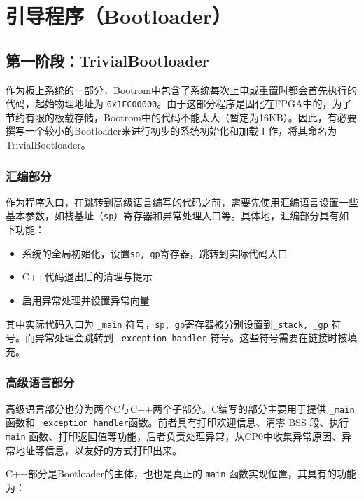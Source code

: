 \chapter{引导程序（Bootloader）}

\section{第一阶段：TrivialBootloader}

作为板上系统的一部分，Bootrom中包含了系统每次上电或重置时都会首先执行的代码，起始物理地址为 \texttt{0x1FC00000}。由于这部分程序是固化在FPGA中的，为了节约有限的板载存储，Bootrom中的代码不能太大（暂定为16KB）。因此，有必要撰写一个较小的Bootloader来进行初步的系统初始化和加载工作，将其命名为TrivialBootloader。

\subsection{汇编部分}

作为程序入口，在跳转到高级语言编写的代码之前，需要先使用汇编语言设置一些基本参数，如栈基址（\texttt{sp}）寄存器和异常处理入口等。具体地，汇编部分具有如下功能：

\begin{itemize}
    \item 系统的全局初始化，设置\texttt{sp, gp}寄存器，跳转到实际代码入口
    \item C++代码退出后的清理与提示
    \item 启用异常处理并设置异常向量
\end{itemize}

其中实际代码入口为 \texttt{\_main} 符号，\texttt{sp, gp}寄存器被分别设置到\texttt{\_stack, \_gp} 符号。而异常处理会跳转到 \texttt{\_exception\_handler} 符号。这些符号需要在链接时被填充。

\subsection{高级语言部分}

高级语言部分也分为两个C与C++两个子部分。C编写的部分主要用于提供 \texttt{\_main} 函数和 \texttt{\_exception\_handler}函数。前者具有打印欢迎信息、清零 BSS 段、执行 \texttt{main} 函数、打印返回值等功能，后者负责处理异常，从CP0中收集异常原因、异常地址等信息，以友好的方式打印出来。

C++部分是Bootloader的主体，也也是真正的 \texttt{main} 函数实现位置，其具有的功能为：

